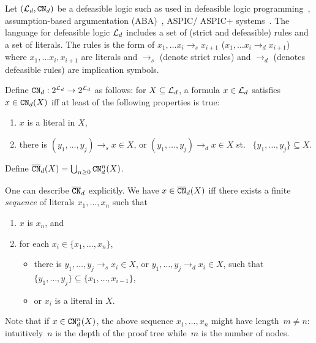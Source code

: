 Let $(\mathcal{L}_d, \texttt{\textup{CN}}_d)$ be a defeasible logic such as used in defeasible logic programming~\cite{Alejandro2014}, assumption-based argumentation (ABA)~\cite{Dung2009}, ASPIC/ ASPIC+ systems~\cite{Prakken2002,ModgilP14}.
The language for defeasible logic $\mathcal{L}_d$ includes a set of (strict and defeasible) rules and a set of literals. The rules is the form of $x_1, \ldots x_i \rightarrow_{s} x_{i+1}$ ($x_1, \ldots x_i \rightarrow_{d} x_{i+1}$) where $x_1, \ldots x_i, x_{i+1}$ are literals and $\rightarrow_{s}$ (denote strict rules) and $\rightarrow_{d}$ (denotes defeasible rules) are implication symbols.
\begin{definition}
Define $\texttt{\textup{CN}}_d: 2^{\mathcal{L}_d} \to 2^{\mathcal{L}_d}$ as follows: for $X \subseteq \mathcal{L}_d$, a formula $x \in \mathcal{L}_d$ satisfies $x \in \texttt{\textup{CN}}_d(X)$ iff at least of the following properties is true:
\begin{enumerate}
    \item $x$ is a literal in $X$,
    \item there is $(y_1,\ldots,y_j)\rightarrow_s x \in X$, or $(y_1,\ldots,y_j)\rightarrow_d x \in X$ st. ~$\{ y_1,\ldots,y_j \} \subseteq X$.
\end{enumerate}
Define $\overline{\texttt{\textup{CN}}}_d(X) = \bigcup_{n \geq 0}\texttt{\textup{CN}}_{d}^{n}(X)$.
\end{definition}

\begin{remark}  One can describe $\overline{\texttt{\textup{CN}}}_d$ explicitly.
We have $x \in \overline{\texttt{\textup{CN}}}_{d}(X)$ iff there exists a finite \emph{sequence} of literals $x_1, \ldots, x_n$ such that
\begin{enumerate}
    \item $x$ is $x_n$, and
    \item for each $x_i \in \{x_1, \ldots, x_n \}$,
    \begin{itemize}
        \item  there is $ y_1 , \ldots , y_j \rightarrow_{s} x_i \in X$, or $ y_1 , \ldots , y_j \rightarrow_{d} x_i \in X$, such that $\{ y_1 , \ldots , y_j \} \subseteq \{x_1, \ldots , x_{i-1} \}$,
        \item or $x_i$ is a literal in $X$.
    \end{itemize}
\end{enumerate}


Note that if $x \in \texttt{\textup{CN}}_{d}^{n}(X)$, the above sequence $x_1, \ldots, x_n$ might have length~$m\neq n$: intuitively~$n$ is the depth of the proof tree while~$m$ is the number of nodes.
\end{remark}





